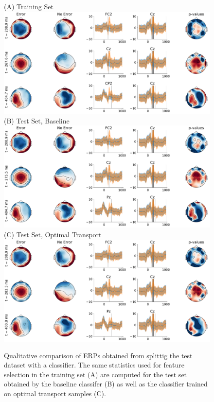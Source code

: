 \documentclass[10pt,a4paper]{article}
\begin{document}
\begin{figure}
    (A) Training Set\\
    \includegraphics[width=\textwidth]{fig/overview-train}
    \vspace{12pt}\\
    (B) Test Set, Baseline\\
    \includegraphics[width=\textwidth]{fig/overview-test}
    \vspace{12pt}\\
    (C) Test Set, Optimal Transport\\
    \includegraphics[width=\textwidth]{fig/overview-ot}
    \caption{Qualitative comparison of ERPs obtained from splittig the test dataset with a classifier.
    The same statistics used for feature selection in the training set (A) are computed for the test set obtained by the baseline classifer (B) as well as the classifier trained on optimal transport samples (C).}
    \label{fig:overview}
\end{figure}
\end{document}
